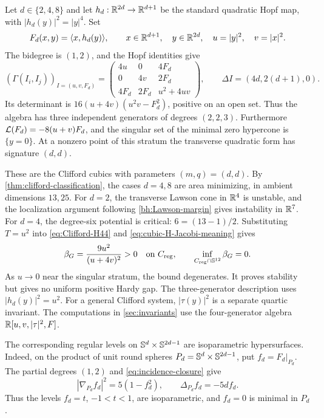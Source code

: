Let $d\in\{2,4,8\}$ and let $h_d:\mathbb R^{2d}\to\mathbb R^{d+1}$ be the
standard quadratic Hopf map, with $|h_d(y)|^2=|y|^4$. Set
\[
 F_d(x,y)=\langle x,h_d(y)\rangle,\qquad
 x\in\mathbb R^{d+1},\quad y\in\mathbb R^{2d},\quad u=|y|^2,\quad v=|x|^2.
\]
The bidegree is $(1,2)$, and the Hopf identities give
\begin{equation}\label{eq:incidence-closure}
 (\Gamma(I_i,I_j))_{I=(u,v,F_d)}=
 \begin{pmatrix}4u&0&4F_d\\0&4v&2F_d\\
 4F_d&2F_d&u^2+4uv\end{pmatrix},\qquad
 \Delta I=(4d,2(d+1),0).
\end{equation}
Its determinant is $16(u+4v)(u^2v-F_d^2)$, positive on an open set.
Thus the algebra has three independent generators of degrees $(2,2,3)$.
Furthermore $\mathcal L(F_d)=-8(u+v)F_d$, and the singular set of the
minimal zero hypercone is $\{y=0\}$. At a nonzero point of this
stratum the transverse quadratic form has signature $(d,d)$.

These are the Clifford cubics with parameters $(m,q)=(d,d)$.
By \cref{thm:clifford-classification}, the cases $d=4,8$ are area
minimizing, in ambient dimensions $13,25$. For $d=2$, the transverse
Lawson cone in $\mathbb R^4$ is unstable, and the localization argument
following \eqref{bh:Lawson-margin} gives instability in $\mathbb R^7$.
For \(d=4\), the degree-six potential is critical:
\(6=(13-1)/2\). Substituting \(T=u^2\) into
\eqref{eq:Clifford-H44} and \eqref{eq:cubic-H-Jacobi-meaning} gives
\[
 \beta_G=\frac{9u^2}{(u+4v)^2}>0
 \quad\text{on }C_{\mathrm{reg}},\qquad
 \inf_{C_{\mathrm{reg}}\cap\mathbb S^{12}}\beta_G=0.
\]
As \(u\to0\) near the singular stratum, the bound degenerates.
It proves stability but gives no uniform positive Hardy gap.
The three-generator description uses $|h_d(y)|^2=u^2$.
For a general Clifford system, $|\tau(y)|^2$ is a separate quartic
invariant. The computations in \cref{sec:invariants} use the
four-generator algebra $\mathbb R[u,v,|\tau|^2,F]$.

The corresponding regular levels on
\(\mathbb S^d\times\mathbb S^{2d-1}\) are isoparametric hypersurfaces.
Indeed, on the product of unit round spheres
\(P_d=\mathbb S^d\times\mathbb S^{2d-1}\), put \(f_d=F_d|_{P_d}\).
The partial degrees \((1,2)\) and \eqref{eq:incidence-closure} give
\[
 |\nabla_{P_d}f_d|^2=5(1-f_d^2),\qquad
 \Delta_{P_d}f_d=-5d f_d.
\]
Thus the levels \(f_d=t\), \(-1<t<1\), are isoparametric,
and \(f_d=0\) is minimal in \(P_d\).
